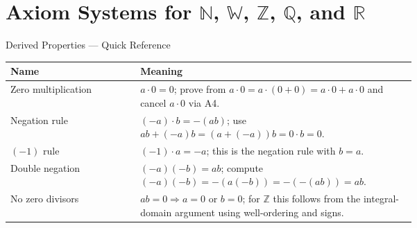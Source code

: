 \section{\texorpdfstring{Axiom Systems for $\mathbb{N}$, $\mathbb{W}$, $\mathbb{Z}$, $\mathbb{Q}$, and $\mathbb{R}$}{Axiom Systems for N, W, Z, Q, and R}}
\label{sec:number-systems-axioms}

\begin{toolkitbox}{Derived Properties --- Quick Reference}
\small
\renewcommand{\arraystretch}{1.4}
\begin{tabular}{@{} l p{0.68\linewidth} @{}}
\toprule
\textbf{Name} & \textbf{Meaning} \\
\midrule
Zero multiplication
  & $a \cdot 0 = 0$; prove from
    $a\cdot 0 = a\cdot(0+0) = a\cdot 0 + a\cdot 0$ and cancel
    $a\cdot 0$ via A4. \\
Negation rule
  & $(-a)\cdot b = -(ab)$; use
    $ab + (-a)b = (a + (-a))b = 0\cdot b = 0$. \\
$(-1)$ rule
  & $(-1)\cdot a = -a$; this is the negation rule with $b = a$. \\
Double negation
  & $(-a)(-b) = ab$; compute
    $(-a)(-b) = -(a(-b)) = -(-(ab)) = ab$. \\
No zero divisors
  & $ab = 0 \Rightarrow a=0$ or $b=0$; for $\mathbb{Z}$ this follows
    from the integral-domain argument using well-ordering and signs. \\
\bottomrule
\end{tabular}
\end{toolkitbox}


 

